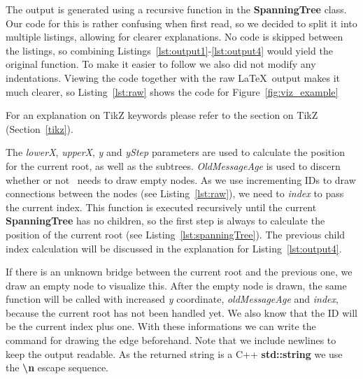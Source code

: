 The output is generated using a recursive function in the \textbf{SpanningTree} class.
Our code for this is rather confusing when first read, so we decided to split it into multiple listings, allowing for clearer explanations.
No code is skipped between the listings, so combining Listings~\ref{lst:output1}-\ref{lst:output4} would yield the original function.
To make it easier to follow we also did not modify any indentations.
Viewing the code together with the raw \LaTeX\ output makes it much clearer, so Listing~\ref{lst:raw} shows the code for Figure~\ref{fig:viz_example}

For an explanation on TikZ keywords please refer to the section on TikZ (Section~\ref{tikz}).


The \textit{lowerX}, \textit{upperX}, \textit{y} and \textit{yStep} parameters are used to calculate the position for the current root, as well as the subtrees.
\textit{OldMessageAge} is used to discern whether or not \tool\ needs to draw empty nodes.
As we use incrementing IDs to draw connections between the nodes (see Listing~\ref{lst:raw}), we need to \textit{index} to pass the current index.
This function is executed recursively until the current \textbf{SpanningTree} has no children, so the first step is always to calculate the position of the current root (see Listing~\ref{lst:spanningTree}).
The previous child index calculation will be discussed in the explanation for Listing~\ref{lst:output4}.


If there is an unknown bridge between the current root and the previous one, we draw an empty node to visualize this.
After the empty node is drawn, the same function will be called with increased \textit{y} coordinate, \textit{oldMessageAge} and \textit{index}, because the current root has not been handled yet.
We also know that the ID will be the current index plus one.
With these informations we can write the command for drawing the edge beforehand.
Note that we include newlines to keep the output readable.
As the returned string is a C++ \textbf{std::string} we use the \textbf{\textbackslash n} escape sequence.

